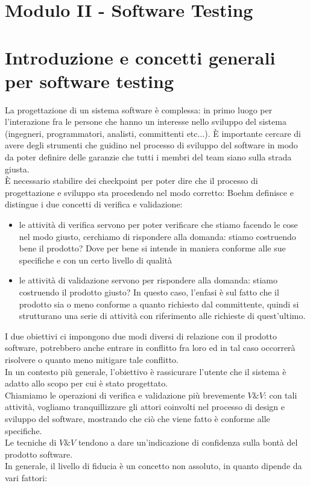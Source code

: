 \documentclass{article}
\begin{document}
\newpage
\section{Modulo II - Software Testing}
\section{Introduzione e concetti generali per software testing}
La progettazione di un sistema software è complessa: in primo luogo per l'interazione fra le persone che hanno un interesse nello sviluppo del sistema (ingegneri, programmatori, analisti, committenti etc...). È importante cercare di avere degli strumenti che guidino nel processo di sviluppo del software in modo da poter definire delle garanzie che tutti i membri del team siano sulla strada giusta.\\È necessario stabilire dei checkpoint per poter dire che il processo di progettazione e sviluppo sta procedendo nel modo corretto: Boehm definisce e distingue i due concetti di verifica e validazione:
\begin{itemize}
\item le attività di verifica servono per poter verificare che stiamo facendo le cose nel modo giusto, cerchiamo di rispondere alla domanda: stiamo costruendo bene il prodotto? Dove per bene si intende in maniera conforme alle sue specifiche e con un certo livello di qualità
\item le attività di validazione servono per rispondere alla domanda: stiamo costruendo il prodotto giusto? In questo caso, l'enfasi è sul fatto che il prodotto sia o meno conforme a quanto richiesto dal committente, quindi si strutturano una serie di attività con riferimento alle richieste di quest'ultimo.
\end{itemize}
I due obiettivi ci impongono due modi diversi di relazione con il prodotto software, potrebbero anche entrare in conflitto fra loro ed in tal caso occorrerà risolvere o quanto meno mitigare tale conflitto.\\ In un contesto più generale, l'obiettivo è rassicurare l'utente che il sistema è adatto allo scopo per cui è stato progettato.\\ Chiamiamo le operazioni di verifica e validazione più brevemente $V\&V$: con tali attività, vogliamo tranquillizzare gli attori coinvolti nel processo di design e sviluppo del software, mostrando che ciò che viene fatto è conforme alle specifiche.\\Le tecniche di $V\&V$ tendono a dare un'indicazione di confidenza sulla bontà del prodotto software.\\ In generale, il livello di fiducia è un concetto non assoluto, in quanto dipende da vari fattori:
\end{document}

